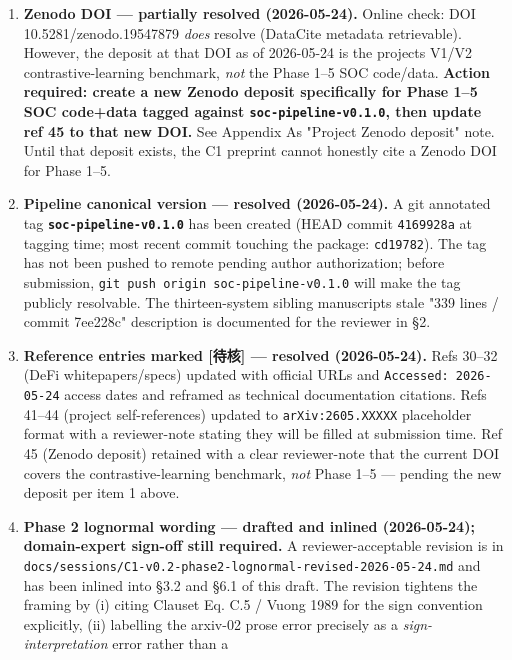 \documentclass[
  11pt]{article}
\providecommand{\tightlist}{%
  \setlength{\itemsep}{0pt}\setlength{\parskip}{0pt}}
\begin{document}
\begin{enumerate}
\def\labelenumi{\arabic{enumi}.}
\tightlist
\item
  \textbf{Zenodo DOI --- partially resolved (2026-05-24).} Online check:
  DOI 10.5281/zenodo.19547879 \emph{does} resolve (DataCite metadata
  retrievable). However, the deposit at that DOI as of 2026-05-24 is the
  project\textquotesingle s V1/V2 contrastive-learning benchmark,
  \emph{not} the Phase 1--5 SOC code/data. \textbf{Action required:
  create a new Zenodo deposit specifically for Phase 1--5 SOC code+data
  tagged against \texttt{soc-pipeline-v0.1.0}, then update ref 45 to
  that new DOI.} See Appendix A\textquotesingle s "Project Zenodo
  deposit" note. Until that deposit exists, the C1 preprint cannot
  honestly cite a Zenodo DOI for Phase 1--5.
\item
  \textbf{Pipeline canonical version --- resolved (2026-05-24).} A git
  annotated tag \textbf{\texttt{soc-pipeline-v0.1.0}} has been created
  (HEAD commit \texttt{4169928a} at tagging time; most recent commit
  touching the package: \texttt{cd19782}). The tag has not been pushed
  to remote pending author authorization; before submission,
  \texttt{git\ push\ origin\ soc-pipeline-v0.1.0} will make the tag
  publicly resolvable. The thirteen-system sibling
  manuscript\textquotesingle s stale "339 lines / commit 7ee228c"
  description is documented for the reviewer in §2.
\item
  \textbf{Reference entries marked {[}待核{]} --- resolved
  (2026-05-24).} Refs 30--32 (DeFi whitepapers/specs) updated with
  official URLs and \texttt{Accessed:\ 2026-05-24} access dates and
  reframed as technical documentation citations. Refs 41--44 (project
  self-references) updated to \texttt{arXiv:2605.XXXXX} placeholder
  format with a reviewer-note stating they will be filled at submission
  time. Ref 45 (Zenodo deposit) retained with a clear reviewer-note that
  the current DOI covers the contrastive-learning benchmark, \emph{not}
  Phase 1--5 --- pending the new deposit per item 1 above.
\item
  \textbf{Phase 2 lognormal wording --- drafted and inlined
  (2026-05-24); domain-expert sign-off still required.} A
  reviewer-acceptable revision is in
  \texttt{docs/sessions/C1-v0.2-phase2-lognormal-revised-2026-05-24.md}
  and has been inlined into §3.2 and §6.1 of this draft. The revision
  tightens the framing by (i) citing Clauset Eq. C.5 / Vuong 1989 for
  the sign convention explicitly, (ii) labelling the arxiv-02 prose
  error precisely as a \emph{sign-interpretation} error rather than a

\end{enumerate}
\end{document}
